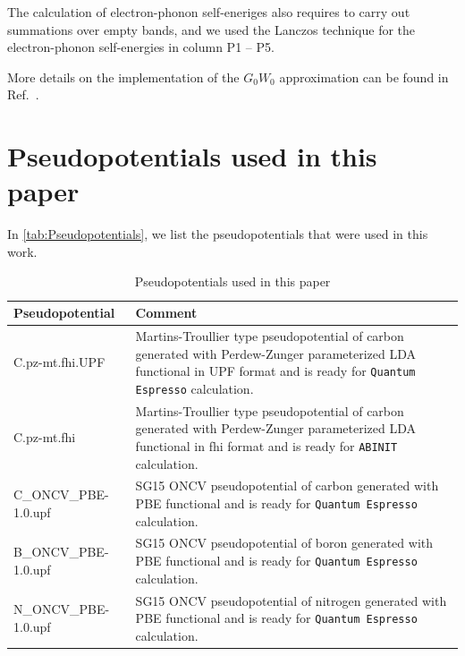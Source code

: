 \documentclass[journal=jctc,manuscript=article,preprint]{achemso}
\begin{document}
The calculation of electron-phonon self-eneriges also requires to carry out  summations over empty bands, and we used the Lanczos technique for the electron-phonon self-energies in column P1 -- P5.

More details on the implementation of the $G_0W_0$ approximation can be found in Ref.~.

\section{Pseudopotentials used in this paper}
In \autoref{tab:Pseudopotentials}, we list the pseudopotentials that were used in this work.
\begin{table}[]
    \centering
    \begin{tabularx}{\textwidth}{lX}
    \hline\hline
    Pseudopotential & Comment  \\
    \hline
    C.pz-mt.fhi.UPF  & Martins-Troullier\cite{troullier1991efficient} type pseudopotential of carbon generated with Perdew-Zunger\cite{perdew1981self} parameterized LDA functional in UPF format and is ready for \texttt{Quantum Espresso} calculation. \\
    \hline
    C.pz-mt.fhi & Martins-Troullier\cite{troullier1991efficient} type pseudopotential of carbon generated with Perdew-Zunger\cite{perdew1981self} parameterized LDA functional in fhi format and is ready for \texttt{ABINIT} calculation. \\
    \hline
    C\_ONCV\_PBE-1.0.upf & SG15\cite{schlipf2015SG15} ONCV\cite{hamann2013ONCV} pseudopotential of carbon generated with PBE functional\cite{perdew1996PBE} and is ready for \texttt{Quantum Espresso} calculation. \\
    \hline
    B\_ONCV\_PBE-1.0.upf & SG15\cite{schlipf2015SG15} ONCV\cite{hamann2013ONCV} pseudopotential of boron generated with PBE functional\cite{perdew1996PBE} and is ready for \texttt{Quantum Espresso} calculation.\\
    \hline
    N\_ONCV\_PBE-1.0.upf & SG15\cite{schlipf2015SG15} ONCV\cite{hamann2013ONCV} pseudopotential of nitrogen generated with PBE functional\cite{perdew1996PBE} and is ready for \texttt{Quantum Espresso} calculation.\\
    \hline\hline
    \end{tabularx}
    \caption{Pseudopotentials used in this paper}
    \label{tab:Pseudopotentials}
\end{table}
\clearpage

\end{document}

